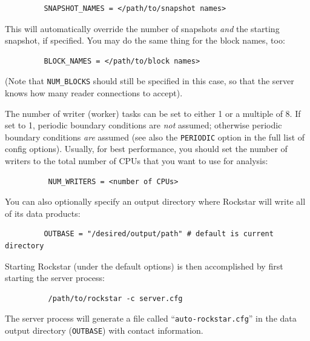 \documentclass[12pt]{article}
\begin{document}
\begin{verbatim}
         SNAPSHOT_NAMES = </path/to/snapshot names>
\end{verbatim}
      This will automatically override the number of snapshots \textit{and} the starting
      snapshot, if specified.  You may do the same thing for the block names,
      too:
\begin{verbatim}
         BLOCK_NAMES = </path/to/block names>
\end{verbatim}
      (Note that \texttt{NUM\_BLOCKS} should still be specified in this case, so that the
      server knows how many reader connections to accept).

      The number of writer (worker) tasks can be set to either 1 or a multiple of
      8. If set to 1, periodic boundary conditions are \textit{not} assumed; otherwise
      periodic boundary conditions \textit{are} assumed (see also the \texttt{PERIODIC} option
      in the full list of config options).  Usually, for best performance, you should set
      the number of writers to the total number of CPUs that you want to use for analysis:
\begin{verbatim}
      	  NUM_WRITERS = <number of CPUs>
\end{verbatim}
	You can also optionally specify an output directory where Rockstar will write all of its data products:
\begin{verbatim}
         OUTBASE = "/desired/output/path" # default is current directory
\end{verbatim}

      Starting Rockstar (under the default options) is then accomplished by
      first starting the server process:
      \begin{verbatim}
      	  /path/to/rockstar -c server.cfg
\end{verbatim}
      The server process will generate a file called ``\texttt{auto-rockstar.cfg}'' in the
      data output directory (\texttt{OUTBASE}) with contact information.
\end{document}
